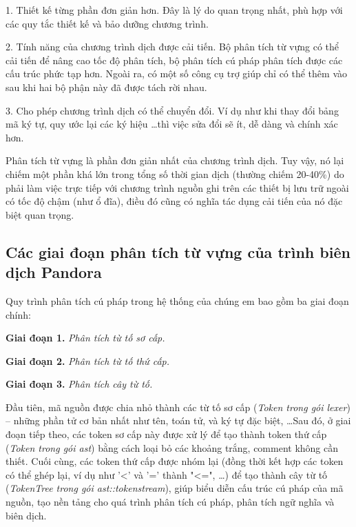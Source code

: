 1. Thiết kế từng phần đơn giản hơn. Đây là lý do quan trọng nhất, phù hợp với các quy tắc thiết kế và bảo dưỡng chương trình.

2. Tính năng của chương trình dịch được cải tiến. Bộ phân tích từ vựng có thể cải tiến để nâng cao tốc độ phân tích, bộ phân tích cú pháp phân tích được các cấu trúc phức tạp hơn. Ngoài ra, có một số công cụ trợ giúp chỉ có thể thêm vào sau khi hai bộ phận này đã được tách rời nhau.

3. Cho phép chương trình dịch có thể chuyển đổi. Ví dụ như khi thay đổi bảng mã ký tự, quy ước lại các ký hiệu \dots\space thì việc sửa đổi sẽ ít, dễ dàng và chính xác hơn.

Phân tích từ vựng là phần đơn giản nhất của chương trình dịch. Tuy vậy, nó lại chiếm một phần khá lớn trong tổng số thời gian dịch (thường chiếm 20-40\%) do phải làm việc trực tiếp với chương trình nguồn ghi trên các thiết bị lưu trữ ngoài có tốc độ chậm (như ổ đĩa), điều đó cũng có nghĩa tác dụng cải tiến của nó đặc biệt quan trọng.

\subsection{Các giai đoạn phân tích từ vựng của trình biên dịch Pandora}
Quy trình phân tích cú pháp trong hệ thống của chúng em bao gồm ba giai đoạn chính:

\textbf{Giai đoạn 1.} \textit{Phân tích từ tố sơ cấp.}

\textbf{Giai đoạn 2.} \textit{Phân tích từ tố thứ cấp.}

\textbf{Giai đoạn 3.} \textit{Phân tích cây từ tố.}

Đầu tiên, mã nguồn được chia nhỏ thành các từ tố sơ cấp (\textit{Token trong gói lexer}) – những phần tử cơ bản nhất như tên, toán tử, và ký tự đặc biệt, \dots Sau đó, ở giai đoạn tiếp theo, các token sơ cấp này được xử lý để tạo thành token thứ cấp (\textit{Token trong gói ast}) bằng cách loại bỏ các khoảng trắng, comment không cần thiết. Cuối cùng, các token thứ cấp được nhóm lại (đồng thời kết hợp các token có thể ghép lại, ví dụ như '<' và '=' thành "<=", \dots) để tạo thành cây từ tố (\textit{TokenTree trong gói ast::tokenstream}), giúp biểu diễn cấu trúc cú pháp của mã nguồn, tạo nền tảng cho quá trình phân tích cú pháp, phân tích ngữ nghĩa và biên dịch. 
